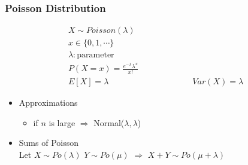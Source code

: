\subsubsection*{Poisson Distribution}
\begin{tcolorbox}
\begin{gather*}
	X \sim Poisson(\lambda)\\
	 x \in \{0, 1, \cdots \} \\
	\lambda : \text{parameter}\\
	P(X = x) = \frac{e^{-\lambda} \lambda^x}{x!}\\
	E[X] = \lambda \hspace{10em} Var(X) = \lambda
\end{gather*}	
\end{tcolorbox}
\begin{itemize}
	\item Approximations
	\begin{itemize}
		\item if $n$ is large $\Longrightarrow$ Normal($\lambda,\lambda$)
	\end{itemize}
	\item Sums of Poisson\\
	Let $X \sim Po(\lambda)$ \quad $Y \sim Po(\mu)$ \quad $\Longrightarrow$ \quad $X+Y \sim Po(\mu + \lambda)$
\end{itemize}
